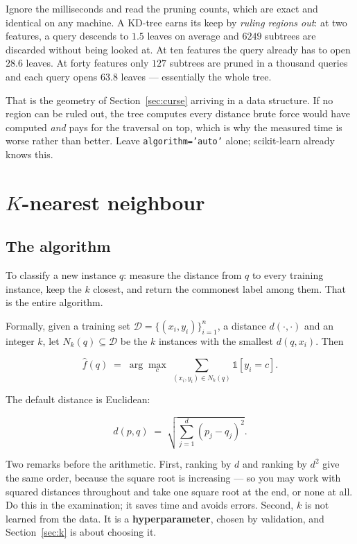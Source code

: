 \documentclass[11pt]{article}
\begin{document}
Ignore the milliseconds and read the pruning counts, which are exact and
identical on any machine. A KD-tree earns its keep by \emph{ruling regions
out}: at two features, a query descends to $1.5$ leaves on average and
$6249$ subtrees are discarded without being looked at. At ten features the
query already has to open $28.6$ leaves. At forty features only $127$
subtrees are pruned in a thousand queries and each query opens $63.8$
leaves --- essentially the whole tree.

That is the geometry of Section~\ref{sec:curse} arriving in a data
structure. If no region can be ruled out, the tree computes every distance
brute force would have computed \emph{and} pays for the traversal on top,
which is why the measured time is worse rather than better. Leave
\texttt{algorithm='auto'} alone; scikit-learn already knows this.

\section{$K$-nearest neighbour}
\label{sec:knn}

\subsection{The algorithm}

\begin{keyidea}
To classify a new instance $q$: measure the distance from $q$ to every training
instance, keep the $k$ closest, and return the commonest label among them.
That is the entire algorithm.
\end{keyidea}

Formally, given a training set $\mathcal{D} = \{(x_i, y_i)\}_{i=1}^{n}$, a
distance $d(\cdot,\cdot)$ and an integer $k$, let $N_k(q) \subseteq
\mathcal{D}$ be the $k$ instances with the smallest $d(q, x_i)$. Then

\[
  \hat{f}(q) \;=\; \arg\max_{c}\ \sum_{(x_i, y_i) \in N_k(q)}
  \mathbb{1}[y_i = c].
\]

The default distance is Euclidean:

\[
  d(p, q) \;=\; \sqrt{\sum_{j=1}^{d} (p_j - q_j)^2}.
\]

Two remarks before the arithmetic. First, ranking by $d$ and ranking by $d^2$
give the same order, because the square root is increasing --- so you may work
with squared distances throughout and take one square root at the end, or none
at all. Do this in the examination; it saves time and avoids errors. Second,
$k$ is not learned from the data. It is a \textbf{hyperparameter}, chosen by
validation, and Section~\ref{sec:k} is about choosing it.
\end{document}
